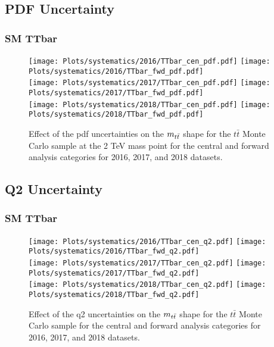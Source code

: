 \newpage



\subsection{PDF Uncertainty}
 \label{sec:PDF_shapes}
 
 
\subsubsection*{SM TTbar}

\begin{figure}[!htbp]
\begin{center}
\texttt{[image: Plots/systematics/2016/TTbar\_cen\_pdf.pdf]}
\texttt{[image: Plots/systematics/2016/TTbar\_fwd\_pdf.pdf]} \\
\texttt{[image: Plots/systematics/2017/TTbar\_cen\_pdf.pdf]}
\texttt{[image: Plots/systematics/2017/TTbar\_fwd\_pdf.pdf]} \\
\texttt{[image: Plots/systematics/2018/TTbar\_cen\_pdf.pdf]}
\texttt{[image: Plots/systematics/2018/TTbar\_fwd\_pdf.pdf]} \\
\caption{Effect of the pdf uncertainties on the $m_{t\bar{t}}$ shape for the $t\bar{t}$ Monte Carlo sample at the 2 TeV mass point for the central and forward analysis categories for 2016, 2017, and 2018 datasets.}
\label{fig:syst_pdf_rs5}
\end{center}
\end{figure}

\newpage




\subsection{Q2 Uncertainty}
 \label{sec:Q2_shapes}
 
 
\subsubsection*{SM TTbar}

\begin{figure}[!htbp]
\begin{center}
\texttt{[image: Plots/systematics/2016/TTbar\_cen\_q2.pdf]}
\texttt{[image: Plots/systematics/2016/TTbar\_fwd\_q2.pdf]} \\
\texttt{[image: Plots/systematics/2017/TTbar\_cen\_q2.pdf]}
\texttt{[image: Plots/systematics/2017/TTbar\_fwd\_q2.pdf]} \\
\texttt{[image: Plots/systematics/2018/TTbar\_cen\_q2.pdf]}
\texttt{[image: Plots/systematics/2018/TTbar\_fwd\_q2.pdf]} \\
\caption{Effect of the q2 uncertainties on the $m_{t\bar{t}}$ shape for the $t\bar{t}$ Monte Carlo sample for the central and forward analysis categories for 2016, 2017, and 2018 datasets.}
\label{fig:syst_q2_tt}
\end{center}
\end{figure}

